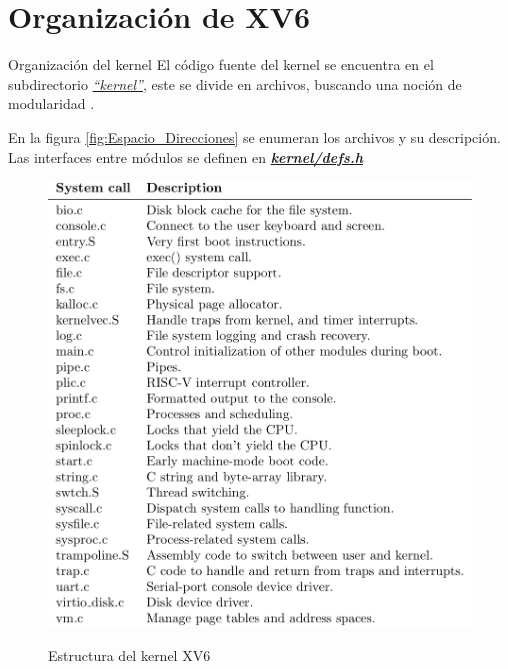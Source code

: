 \documentclass{libs/ufc_format}
\begin{document}
\section{Organización de XV6}
\begin{frame}{Organización del kernel}
  El código fuente del kernel se encuentra en el subdirectorio \href{https://github.com/CarlosSandoval-03/xv6-riscv/tree/riscv/kernel}{\textit{“kernel”}}, este se divide en archivos, buscando una noción de modularidad \cite{xv6_book}.

  \vspace{0.3cm}

  En la figura \ref{fig:Espacio_Direcciones} se enumeran los archivos y su descripción. Las interfaces entre módulos se definen en \href{https://github.com/CarlosSandoval-03/xv6-riscv/blob/riscv/kernel/defs.h}{\textit{\textbf{kernel/defs.h}}}
\end{frame}
\begin{frame}
  \begin{figure}
    \centering
    \caption{Estructura del kernel XV6}
    \includegraphics[scale=0.55]{libs/img/estructura_kernel.png}
    \label{fig:Estructura_Kernel}
  \end{figure}
\end{frame}
\end{document}
